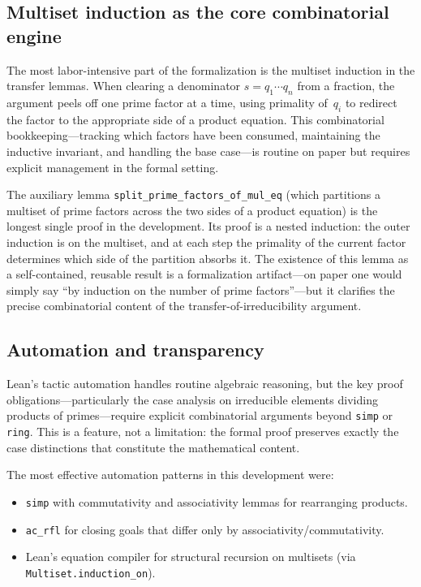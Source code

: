 \documentclass[11pt]{article}
\theoremstyle{plain}
\theoremstyle{definition}
\theoremstyle{remark}
\newcommand{\li}[1]{\texorpdfstring{\texttt{#1}}{#1}}
\begin{document}
\subsection{Multiset induction as the core combinatorial engine}

The most labor-intensive part of the formalization is the multiset induction in
the transfer lemmas.  When clearing a denominator $s=q_1\cdots q_n$ from a
fraction, the argument peels off one prime factor at a time, using primality
of~$q_i$ to redirect the factor to the appropriate side of a product equation.
This combinatorial bookkeeping---tracking which factors have been consumed,
maintaining the inductive invariant, and handling the base case---is routine on
paper but requires explicit management in the formal setting.

The auxiliary lemma \li{split\_prime\_factors\_of\_mul\_eq} (which partitions a
multiset of prime factors across the two sides of a product equation) is the
longest single proof in the development.  Its proof is a nested induction:
the outer induction is on the multiset, and at each step the primality of the
current factor determines which side of the partition absorbs it.  The
existence of this lemma as a self-contained, reusable result is a
formalization artifact---on paper one would simply say ``by induction on the
number of prime factors''---but it clarifies the precise combinatorial content
of the transfer-of-irreducibility argument.

\subsection{Automation and transparency}

Lean's tactic automation handles routine algebraic reasoning, but the key proof
obligations---particularly the case analysis on irreducible elements dividing
products of primes---require explicit combinatorial arguments beyond
\li{simp} or \li{ring}.  This is a feature, not a limitation: the formal proof
preserves exactly the case distinctions that constitute the mathematical
content.

The most effective automation patterns in this development were:
\begin{itemize}[nosep]
\item \li{simp} with commutativity and associativity lemmas for rearranging
  products.
\item \li{ac\_rfl} for closing goals that differ only by
  associativity/commutativity.
\item Lean's equation compiler for structural recursion on multisets (via
  \li{Multiset.induction\_on}).
\end{itemize}
\end{document}
